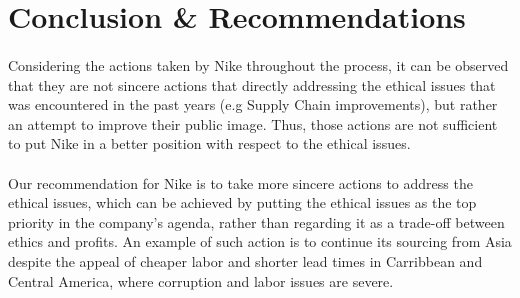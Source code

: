 \section{Conclusion \& Recommendations}

\paragraph{} Considering the actions taken by Nike throughout the process, it can be observed that they are not sincere actions that directly addressing the ethical issues that was encountered in the past years (e.g Supply Chain improvements), but rather an attempt to improve their public image. Thus, those actions are not sufficient to put Nike in a better position with respect to the ethical issues.

\paragraph{} Our recommendation for Nike is to take more sincere actions to address the ethical issues, which can be achieved by putting the ethical issues as the top priority in the company's agenda, rather than regarding it as a trade-off between ethics and profits. An example of such action is to continue its sourcing from Asia despite the appeal of cheaper labor and shorter lead times in Carribbean and Central America, where corruption and labor issues are severe.